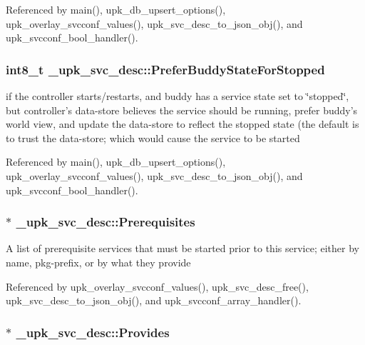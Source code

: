 Referenced by main(), upk\_\-db\_\-upsert\_\-options(), upk\_\-overlay\_\-svcconf\_\-values(), upk\_\-svc\_\-desc\_\-to\_\-json\_\-obj(), and upk\_\-svcconf\_\-bool\_\-handler().

\subsubsection[{PreferBuddyStateForStopped}]{\setlength{\rightskip}{0pt plus 5cm}int8\_\-t {\bf \_\-upk\_\-svc\_\-desc::PreferBuddyStateForStopped}}\label{struct__upk__svc__desc_a7122c24ad2843e92e8375826884c117e}
if the controller starts/restarts, and buddy has a service state set to \char`\"{}stopped\char`\"{}, but controller's data-\/store believes the service should be running, prefer buddy's world view, and update the data-\/store to reflect the stopped state (the default is to trust the data-\/store; which would cause the service to be started 

Referenced by main(), upk\_\-db\_\-upsert\_\-options(), upk\_\-overlay\_\-svcconf\_\-values(), upk\_\-svc\_\-desc\_\-to\_\-json\_\-obj(), and upk\_\-svcconf\_\-bool\_\-handler().

\subsubsection[{Prerequisites}]{ $\ast$ {\bf \_\-upk\_\-svc\_\-desc::Prerequisites}}\label{struct__upk__svc__desc_afaf102d348fd0a9520a92a1ec1dcdca1}
A list of prerequisite services that must be started prior to this service; either by name, pkg-\/prefix, or by what they provide 

Referenced by upk\_\-overlay\_\-svcconf\_\-values(), upk\_\-svc\_\-desc\_\-free(), upk\_\-svc\_\-desc\_\-to\_\-json\_\-obj(), and upk\_\-svcconf\_\-array\_\-handler().

\subsubsection[{Provides}]{ $\ast$ {\bf \_\-upk\_\-svc\_\-desc::Provides}}\label{struct__upk__svc__desc_a5b62fecb7d7a0d76b797c3bbc3051414}


